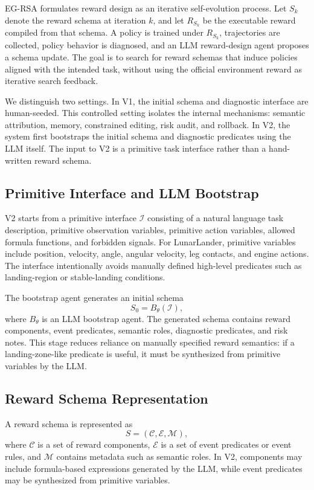\documentclass[11pt]{article}
\begin{document}
EG-RSA formulates reward design as an iterative self-evolution process. Let $S_k$ denote the reward schema at iteration $k$, and let $R_{S_k}$ be the executable reward compiled from that schema. A policy is trained under $R_{S_k}$, trajectories are collected, policy behavior is diagnosed, and an LLM reward-design agent proposes a schema update. The goal is to search for reward schemas that induce policies aligned with the intended task, without using the official environment reward as iterative search feedback.

We distinguish two settings. In V1, the initial schema and diagnostic interface are human-seeded. This controlled setting isolates the internal mechanisms: semantic attribution, memory, constrained editing, risk audit, and rollback. In V2, the system first bootstraps the initial schema and diagnostic predicates using the LLM itself. The input to V2 is a primitive task interface rather than a hand-written reward schema.

\subsection{Primitive Interface and LLM Bootstrap}

V2 starts from a primitive interface $\mathcal{I}$ consisting of a natural language task description, primitive observation variables, primitive action variables, allowed formula functions, and forbidden signals. For LunarLander, primitive variables include position, velocity, angle, angular velocity, leg contacts, and engine actions. The interface intentionally avoids manually defined high-level predicates such as landing-region or stable-landing conditions.

The bootstrap agent generates an initial schema
\begin{equation}
S_0 = B_\theta(\mathcal{I}),
\end{equation}
where $B_\theta$ is an LLM bootstrap agent. The generated schema contains reward components, event predicates, semantic roles, diagnostic predicates, and risk notes. This stage reduces reliance on manually specified reward semantics: if a landing-zone-like predicate is useful, it must be synthesized from primitive variables by the LLM.

\subsection{Reward Schema Representation}

A reward schema is represented as
\begin{equation}
S = (\mathcal{C}, \mathcal{E}, \mathcal{M}),
\end{equation}
where $\mathcal{C}$ is a set of reward components, $\mathcal{E}$ is a set of event predicates or event rules, and $\mathcal{M}$ contains metadata such as semantic roles. In V2, components may include formula-based expressions generated by the LLM, while event predicates may be synthesized from primitive variables.
\end{document}
